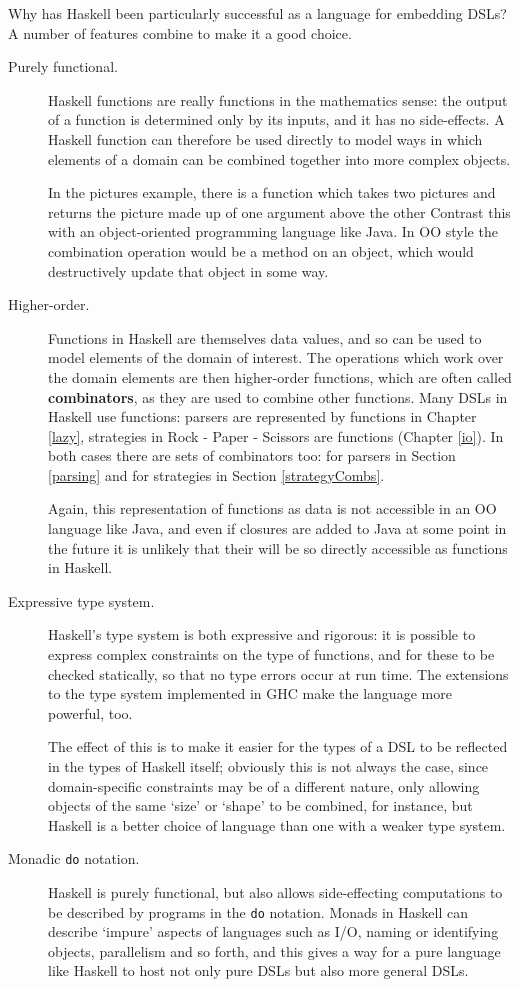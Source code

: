 Why has Haskell been particularly successful as a language for embedding DSLs? A number of features combine to make it a good choice.
\begin{description}
\item[Purely functional.] Haskell functions are really functions in the mathematics sense: the output of a function is determined only by its inputs, and it has no side-effects. A Haskell function can therefore be used directly to model ways in which elements of a domain can be combined together into more complex objects. 

In the pictures example, there is a function which takes two pictures and returns the picture made up of one argument above the other
Contrast this with an object-oriented programming language like Java. In OO style the combination operation would be a method on an object, which would destructively update that object in some way.

\item[Higher-order.] Functions in Haskell are themselves data values, and so can be used to model elements of the domain of interest. The operations which work over the domain elements are then higher-order functions, which are often called \textbf{combinators}, as they are used to combine other functions. Many DSLs in Haskell use functions: parsers are represented by functions in Chapter \ref{lazy}, strategies in Rock - Paper - Scissors are functions (Chapter \ref{io}). In both cases there are sets of combinators too: for parsers in Section \ref{parsing} and for strategies in Section \ref{strategyCombs}.

Again, this representation of functions as data is not accessible in an OO language like Java, and even if closures are added to Java at some point in the future it is unlikely that their will be so directly accessible as functions in Haskell.

\item[Expressive type system.] Haskell's type system is both expressive and rigorous: it is possible to express complex constraints on the type of functions, and for these to be checked statically, so that no type errors occur at run time. The extensions to the type system implemented in GHC make the language more powerful, too. 

The effect of this is to make it easier for the types of a DSL to be reflected in the types of Haskell itself; obviously this is not always the case, since domain-specific constraints may be of a different nature, only allowing objects of the same `size' or `shape' to be combined, for instance, but Haskell is a better choice of language than one with a weaker type system.

\item[Monadic \texttt{do} notation.] Haskell is purely functional, but also allows side-effecting computations to be described by programs in the \texttt{do} notation. Monads in Haskell can describe `impure' aspects of languages such as I/O, naming or identifying objects, parallelism and so forth, and this gives a way for a pure language like Haskell to host not only pure DSLs but also more general DSLs.

\end{description}

